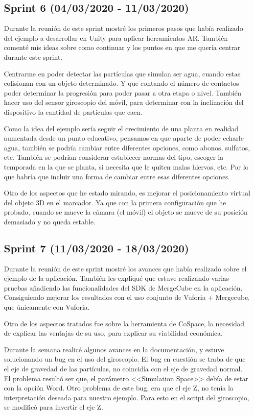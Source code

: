 \subsection{Sprint 6 (04/03/2020 - 11/03/2020)}

Durante la reunión de este sprint mostré los primeros pasos que había realizado del ejemplo a desarrollar en Unity para aplicar herramientas AR. También comenté mis ideas sobre como continuar y los puntos en que me quería centrar durante este sprint.

Centrarme en poder detectar las partículas que simulan ser agua, cuando estas colisionan con un objeto determinado. Y que contando el número de contactos poder determinar la progresión para poder pasar a otra etapa o nivel. También hacer uso del sensor giroscopio del móvil, para determinar con la inclinación del dispositivo la cantidad de partículas que caen.

Como la idea del ejemplo sería seguir el crecimiento de una planta en realidad aumentada desde un punto educativo, pensamos en que aparte de poder echarle agua, también se podría cambiar entre diferentes opciones, como abonos, sulfatos, etc. También se podrían considerar establecer normas del tipo, escoger la temporada en la que se planta, si necesita que le quiten malas hiervas, etc. Por lo que habría que incluir una forma de cambiar entre esas diferentes opciones.

Otro de los aspectos que he estado mirando, es mejorar el posicionamiento virtual del objeto 3D en el marcador. Ya que con la primera configuración que he probado, cuando se mueve la cámara (el móvil) el objeto se mueve de su posición demasiado y no queda estable.

\subsection{Sprint 7 (11/03/2020 - 18/03/2020)}
Durante la reunión de este sprint mostré los avances que había realizado sobre el ejemplo de la aplicación. También les expliqué que estuve realizando varias pruebas añadiendo las funcionalidades del SDK de MergeCube en la aplicación. Consiguiendo mejorar los resultados con el uso conjunto de Vuforia + Mergecube, que únicamente con Vuforia.

Otro de los aspectos tratados fue sobre la herramienta de CoSpace, la necesidad de explicar las ventajas de su uso, para explicar su viabilidad económica.

Durante la semana realicé algunos avances en la documentación, y estuve solucionando un bug en el uso del giroscopio. El bug en cuestión se traba de que el eje de gravedad de las partículas, no coincidía con el eje de gravedad normal. El problema resultó ser que, el parámetro <<Simulation Space>> debía de estar con la opción Word. Otro problema de este bug, era que el eje Z, no tenía la interpretación deseada para nuestro ejemplo. Para esto en el script del giroscopio, se modificó para invertir el eje Z.
 
